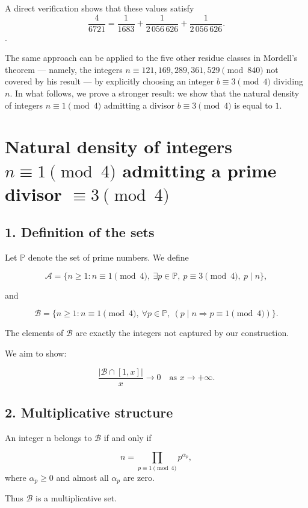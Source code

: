 \documentclass[12pt]{article}
\begin{document}
A direct verification shows that these values satisfy
\[
\frac{4}{6721} = \frac{1}{1683} + \frac{1}{2\,056\,626} + \frac{1}{2\,056\,626}.
\].

The same approach can be applied to the five other residue classes in Mordell's theorem — namely, the integers \(n \equiv  121, 169, 289, 361, 529 \pmod{840}\) not covered by his result — by explicitly choosing an integer \(b \equiv 3 \pmod{4}\) dividing \(n\).  
In what follows, we prove a stronger result: we show that the natural density of integers \(n \equiv 1 \pmod{4}\) admitting a divisor \(b \equiv 3 \pmod{4}\) is equal to \(1\). 

\section*{Natural density of integers \(n \equiv 1 \pmod{4}\) admitting a prime divisor \( \equiv 3 \pmod{4}\)}

\subsection*{1. Definition of the sets}

Let \(\mathbb{P}\) denote the set of prime numbers. We define

\[
\mathcal{A}
=
\{ n \ge 1 : n \equiv 1 \pmod{4},\ \exists p \in \mathbb{P},\ p \equiv 3 \pmod{4},\ p \mid n \},
\]

and

\[
\mathcal{B}
=
\{ n \ge 1 : n \equiv 1 \pmod{4},\ \forall p \in \mathbb{P},\ (p \mid n \Rightarrow p \equiv 1 \pmod{4}) \}.
\]

The elements of \(\mathcal{B}\) are exactly the integers not captured by our construction.

We aim to show:

\[
\frac{|\mathcal{B} \cap [1,x]|}{x} \longrightarrow 0
\quad \text{as } x \to +\infty.
\]

\subsection*{2. Multiplicative structure}

An integer n  belongs to \(\mathcal{B}\) if and only if

\[
n = \prod_{p \equiv 1 \pmod{4}} p^{\alpha_p},
\]
where \(\alpha_p \ge 0\) and almost all \(\alpha_p\) are zero.

Thus \(\mathcal{B}\) is a multiplicative set.
\end{document}
